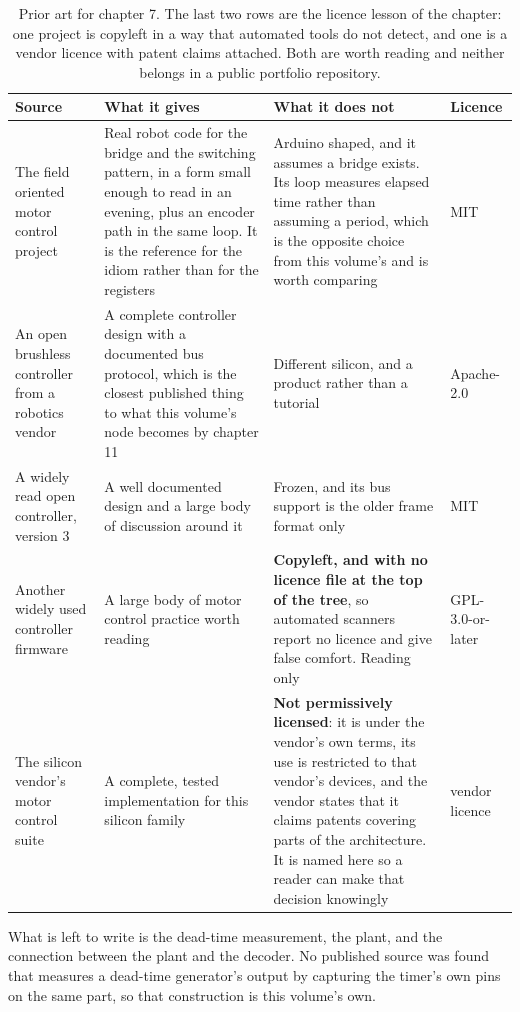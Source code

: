 \begin{table}[H]\centering\small
\begin{tabular}{p{34mm}p{46mm}p{38mm}p{20mm}}
\toprule
Source & What it gives & What it does not & Licence \\
\midrule
The field oriented motor control project & Real robot code for the bridge and the switching pattern, in a form small enough to read in an evening, plus an encoder path in the same loop. It is the reference for the idiom rather than for the registers & Arduino shaped, and it assumes a bridge exists. Its loop measures elapsed time rather than assuming a period, which is the opposite choice from this volume's and is worth comparing & MIT \\
An open brushless controller from a robotics vendor & A complete controller design with a documented bus protocol, which is the closest published thing to what this volume's node becomes by chapter 11 & Different silicon, and a product rather than a tutorial & Apache-2.0 \\
A widely read open controller, version 3 & A well documented design and a large body of discussion around it & Frozen, and its bus support is the older frame format only & MIT \\
Another widely used controller firmware & A large body of motor control practice worth reading & \textbf{Copyleft, and with no licence file at the top of the tree}, so automated scanners report no licence and give false comfort. Reading only & GPL-3.0-or-later \\
The silicon vendor's motor control suite & A complete, tested implementation for this silicon family & \textbf{Not permissively licensed}: it is under the vendor's own terms, its use is restricted to that vendor's devices, and the vendor states that it claims patents covering parts of the architecture. It is named here so a reader can make that decision knowingly & vendor licence \\
\bottomrule
\end{tabular}
\caption{Prior art for chapter 7. The last two rows are the licence lesson of the chapter: one project is copyleft in a way that automated tools do not detect, and one is a vendor licence with patent claims attached. Both are worth reading and neither belongs in a public portfolio repository.}
\end{table}

What is left to write is the dead-time measurement, the plant, and the
connection between the plant and the decoder. No published source was found that
measures a dead-time generator's output by capturing the timer's own pins on the
same part, so that construction is this volume's own.

